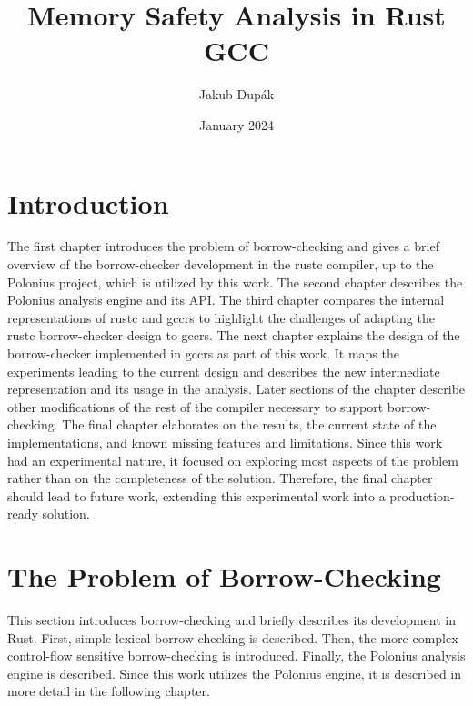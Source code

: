 \documentclass[
  11pt,
  twoside,symmetric]{report}
\title{Memory Safety Analysis in Rust GCC}
\author{Jakub Dupák}
\date{January 2024}
\begin{document}
\maketitle



\clearpage


\declaration


{
\setcounter{tocdepth}{2}
\tableofcontents
}
\listoffigures
\hypertarget{introduction}{%
\chapter{Introduction}\label{introduction}}


The first chapter introduces the problem of borrow-checking and gives a
brief overview of the borrow-checker development in the rustc compiler,
up to the Polonius project, which is utilized by this work. The second
chapter describes the Polonius analysis engine and its API. The third
chapter compares the internal representations of rustc and gccrs to
highlight the challenges of adapting the rustc borrow-checker design to
gccrs. The next chapter explains the design of the borrow-checker
implemented in gccrs as part of this work. It maps the experiments
leading to the current design and describes the new intermediate
representation and its usage in the analysis. Later sections of the
chapter describe other modifications of the rest of the compiler
necessary to support borrow-checking. The final chapter elaborates on
the results, the current state of the implementations, and known missing
features and limitations. Since this work had an experimental nature, it
focused on exploring most aspects of the problem rather than on the
completeness of the solution. Therefore, the final chapter should lead
to future work, extending this experimental work into a production-ready
solution.

\hypertarget{the-problem-of-borrow-checking}{%
\chapter{The Problem of
Borrow-Checking}\label{the-problem-of-borrow-checking}}

This section introduces borrow-checking and briefly describes its
development in Rust. First, simple lexical borrow-checking is described.
Then, the more complex control-flow sensitive borrow-checking is
introduced. Finally, the Polonius analysis engine is described. Since
this work utilizes the Polonius engine, it is described in more detail
in the following chapter.
\end{document}
